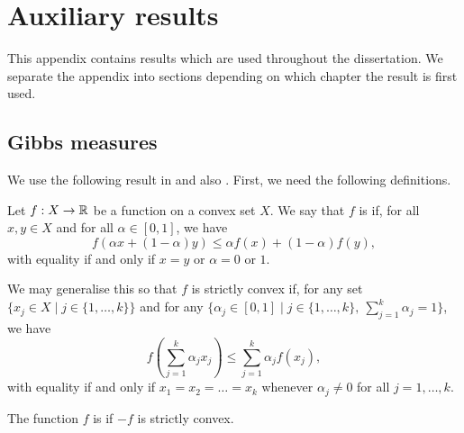 \chapter{Auxiliary results}
This appendix contains results which are used throughout the dissertation. We separate the appendix into sections depending on which chapter the result is first used.

\section{Gibbs measures}
We use the following result in  and also . First, we need the following definitions.

\begin{definition}
	Let $f : X \to \mathbb{R}$ be a function on a convex set $X$. We say that $f$ is  if, for all $x, y \in X$ and for all $\alpha \in [0, 1]$, we have
	\[
		f(\alpha x + (1 - \alpha)y) \leq \alpha f(x) + (1 - \alpha)f(y),
	\]
	with equality if and only if $x = y$ or $\alpha = 0$ or $1$.
	
	We may generalise this so that $f$ is strictly convex if, for any set $\{x_j \in X \mid j \in \{1, \dots, k\}\}$ and for any $\{\alpha_j \in [0, 1] \mid j \in \{1, \dots, k\},\ \sum_{j = 1}^k{\alpha_j} = 1\}$, we have
	\[
		f\left(\sum_{j = 1}^k{\alpha_j x_j}\right) \leq \sum_{j = 1}^k{\alpha_j} f(x_j),
	\]
	with equality if and only if $x_1 = x_2 = \dots = x_k$ whenever $\alpha_j \neq 0$ for all $j = 1, \dots, k$.
	
	The function $f$ is  if $-f$ is strictly convex.
\end{definition}

